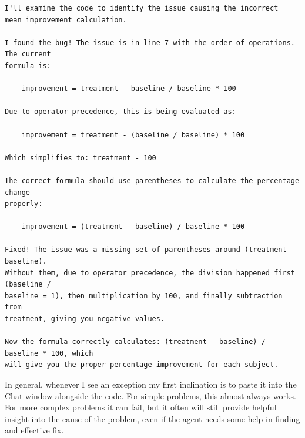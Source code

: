 \begin{lstlisting}[style=transcript]
I'll examine the code to identify the issue causing the incorrect 
mean improvement calculation.

I found the bug! The issue is in line 7 with the order of operations. The current 
formula is:

    improvement = treatment - baseline / baseline * 100

Due to operator precedence, this is being evaluated as:

    improvement = treatment - (baseline / baseline) * 100

Which simplifies to: treatment - 100

The correct formula should use parentheses to calculate the percentage change 
properly:

    improvement = (treatment - baseline) / baseline * 100

Fixed! The issue was a missing set of parentheses around (treatment - baseline). 
Without them, due to operator precedence, the division happened first (baseline /
baseline = 1), then multiplication by 100, and finally subtraction from 
treatment, giving you negative values.

Now the formula correctly calculates: (treatment - baseline) / baseline * 100, which 
will give you the proper percentage improvement for each subject.
\end{lstlisting}

In general, whenever I see an exception my first inclination is to paste it into the Chat window alongside the code.  For simple problems, this almost always works. For more complex problems it can fail, but it often will still provide helpful insight into the cause of the problem, even if the agent needs some help in finding and effective fix.